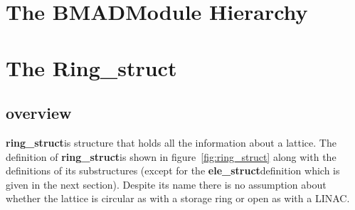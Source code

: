 \documentclass{book}
\newcommand{\ringstruct}{{\bf ring\_struct}}
\newcommand{\elestruct}{{\bf ele\_struct}}
\newcommand{\bmad}{{\bf BMAD}}
\begin{document}
\chapter{The \bmad Module Hierarchy}


\chapter{The Ring\_struct}

\section{overview}

\ringstruct is structure that holds all the information about a lattice.
The definition of \ringstruct is shown in figure~\ref{fig:ring_struct}
along with the definitions of its substructures (except for the
\elestruct definition which is given in the next section). Despite its
name there is no assumption about whether the lattice is circular as
with a storage ring or open as with a LINAC.
\end{document}
